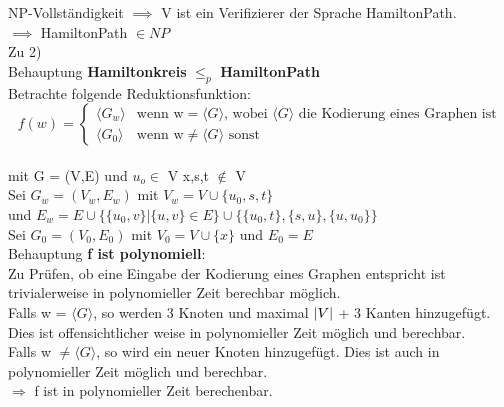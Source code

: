 \documentclass[answers]{submit}
\begin{document}
\begin{exercise}[6]{NP-Vollständigkeit}
{    $\implies$ V ist ein Verifizierer der Sprache HamiltonPath. \\

    $\implies$ HamiltonPath $\in NP$ \\

    Zu 2) \\

    Behauptung \textbf{Hamiltonkreis} $\leq_p$ \textbf{HamiltonPath} \\

    Betrachte folgende Reduktionsfunktion: \\

    $$f(w)=\begin{cases}
        \langle G_w\rangle  & \text{wenn w} = \langle G \rangle \text{, wobei }  \langle G \rangle \text{ die Kodierung eines Graphen ist} \\
        \langle G_0 \rangle & \text{wenn w} \neq \langle G \rangle \text{ sonst}
      \end{cases}$$ \\

    mit G = (V,E) und $u_o \in$ V x,s,t $\notin$ V \\

    Sei $G_w = (V_w,E_w)$ mit $V_w= V \cup \{u_0,s,t\} $ \\

    und  $E_w= E \cup \{ \{ u_0,v \}| \{u,v\} \in E \} \cup \{ \{ u_0,t\}, \{ s,u\}, \{ u,u_0\}  \}$   \\

    Sei $G_0 = (V_0,E_0)$ mit $V_0 = V \cup \{ x \} $ und $E_0 = E$ \\

    Behauptung \textbf{f ist polynomiell}: \\

    Zu Prüfen, ob eine Eingabe der Kodierung eines Graphen entspricht ist trivialerweise in polynomieller Zeit berechbar möglich. \\

    Falls w = $\langle G \rangle$, so werden 3 Knoten und maximal $\left\vert V \right\vert$ + 3  Kanten hinzugefügt. Dies ist offensichtlicher weise in polynomieller Zeit möglich und berechbar. \\

    Falls w $ \neq\langle G \rangle$, so wird ein neuer Knoten hinzugefügt. Dies ist auch in polynomieller Zeit möglich und berechbar. \\

    $\Rightarrow$ f ist in polynomieller Zeit berechenbar. \\

}
\end{exercise}
\end{document}
